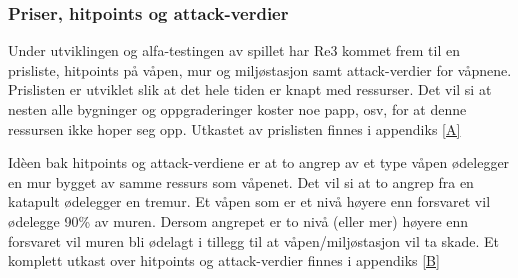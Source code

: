 \subsubsection{Priser, hitpoints og attack-verdier}
Under utviklingen og alfa-testingen av spillet har Re3 kommet frem til en prisliste, hitpoints på våpen, mur og miljøstasjon samt attack-verdier for våpnene.\\

Prislisten er utviklet slik at det hele tiden er knapt med ressurser. Det vil si at nesten alle bygninger og oppgraderinger koster noe papp, osv, for at denne ressursen ikke hoper seg opp. Utkastet av prislisten finnes i appendiks \ref{A}

Idèen bak hitpoints og attack-verdiene er at to angrep av et type våpen ødelegger en mur bygget av samme ressurs som våpenet. Det vil si at to angrep fra en katapult ødelegger en tremur. Et våpen som er et nivå høyere enn forsvaret vil ødelegge 90\% av muren. Dersom angrepet er to nivå (eller mer) høyere enn forsvaret vil muren bli ødelagt i tillegg til at våpen/miljøstasjon vil ta skade. Et komplett utkast over hitpoints og attack-verdier finnes i appendiks \ref{B}
